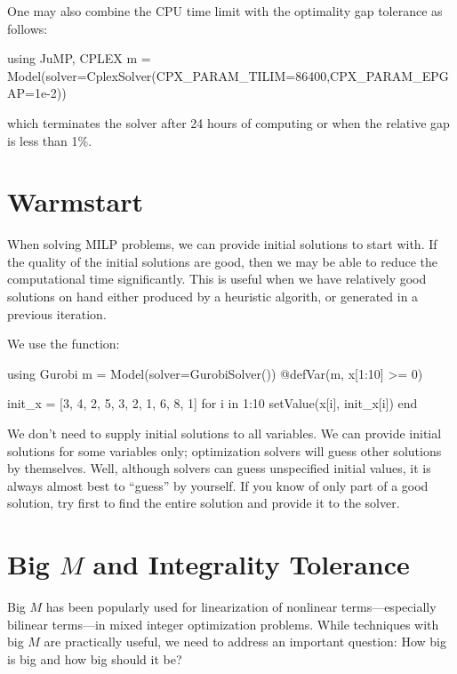 One may also combine the CPU time limit with the optimality gap tolerance as follows:
\begin{code}
using JuMP, CPLEX
m = Model(solver=CplexSolver(CPX_PARAM_TILIM=86400,CPX_PARAM_EPGAP=1e-2))
\end{code}
\noindent which terminates the solver after 24 hours of computing or when the relative gap is less than 1\%.



\section{Warmstart}
When solving MILP problems, we can provide initial solutions to start with. If the quality of the initial solutions are good, then we may be able to reduce the computational time significantly. This is useful when we have relatively good solutions on hand either produced by a heuristic algorith, or generated in a previous iteration.

We use the  function:
\begin{code}
using Gurobi
m = Model(solver=GurobiSolver())
@defVar(m, x[1:10] >= 0)

init_x = [3, 4, 2, 5, 3, 2, 1, 6, 8, 1]
for i in 1:10
    setValue(x[i], init_x[i])
end
\end{code}
\noindent We don't need to supply initial solutions to all variables. We can provide initial solutions for some variables only; optimization solvers will guess other solutions by themselves. Well, although solvers can guess unspecified initial values, it is always almost best to ``guess'' by yourself. If you know of only part of a good solution, try first to find the entire solution and provide it to the solver.



\section{Big $M$ and Integrality Tolerance}

Big $M$ has been popularly used for linearization of nonlinear terms---especially bilinear terms---in mixed integer optimization problems. While techniques with big $M$ are practically useful, we need to address an important question: How big is big and how big should it be?

